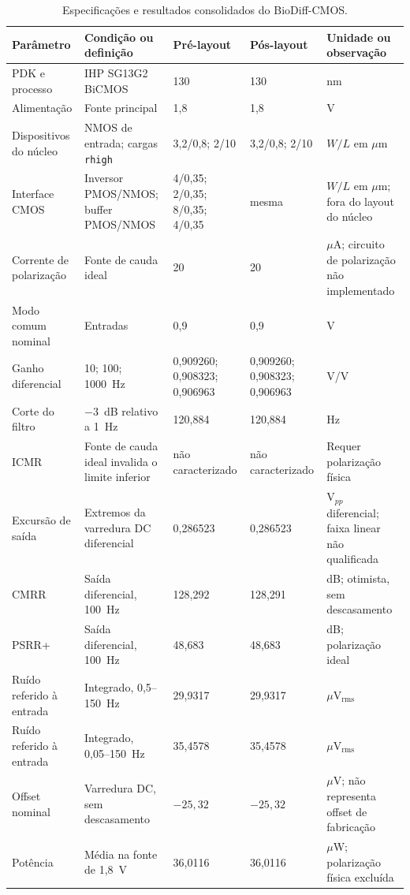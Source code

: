 \documentclass[conference]{IEEEtran}
\newcommand{\NA}{não caracterizado}
\begin{document}
\begin{table}[t]
\caption{Especificações e resultados consolidados do BioDiff-CMOS.}
\label{tab:specs}
\centering
\scriptsize
\setlength{\tabcolsep}{4pt}
\begin{tabularx}{\textwidth}{p{3.1cm} Y p{2.25cm} p{2.25cm} p{2.6cm}}
\hline
Parâmetro & Condição ou definição & Pré-layout & Pós-layout & Unidade ou observação \\
\hline
PDK e processo & IHP SG13G2 BiCMOS & 130 & 130 & nm \\
Alimentação & Fonte principal & 1,8 & 1,8 & V \\
Dispositivos do núcleo & NMOS de entrada; cargas \texttt{rhigh} & 3,2/0,8; 2/10 & 3,2/0,8; 2/10 & $W/L$ em $\mu$m \\
Interface CMOS & Inversor PMOS/NMOS; buffer PMOS/NMOS & 4/0,35; 2/0,35; 8/0,35; 4/0,35 & mesma & $W/L$ em $\mu$m; fora do layout do núcleo \\
Corrente de polarização & Fonte de cauda ideal & 20 & 20 & $\mu$A; circuito de polarização não implementado \\
Modo comum nominal & Entradas & 0,9 & 0,9 & V \\
Ganho diferencial & 10; 100; 1000~Hz & 0,909260; 0,908323; 0,906963 & 0,909260; 0,908323; 0,906963 & V/V \\
Corte do filtro & $-3$~dB relativo a 1~Hz & 120,884 & 120,884 & Hz \\
ICMR & Fonte de cauda ideal invalida o limite inferior & \NA & \NA & Requer polarização física \\
Excursão de saída & Extremos da varredura DC diferencial & 0,286523 & 0,286523 & V$_{pp}$ diferencial; faixa linear não qualificada \\
CMRR & Saída diferencial, 100~Hz & 128,292 & 128,291 & dB; otimista, sem descasamento \\
PSRR+ & Saída diferencial, 100~Hz & 48,683 & 48,683 & dB; polarização ideal \\
Ruído referido à entrada & Integrado, 0,5--150~Hz & 29,9317 & 29,9317 & $\mu$V$_{\mathrm{rms}}$ \\
Ruído referido à entrada & Integrado, 0,05--150~Hz & 35,4578 & 35,4578 & $\mu$V$_{\mathrm{rms}}$ \\
Offset nominal & Varredura DC, sem descasamento & $-25,32$ & $-25,32$ & $\mu$V; não representa offset de fabricação \\
Potência & Média na fonte de 1,8~V & 36,0116 & 36,0116 & $\mu$W; polarização física excluída \\

\end{tabularx}
\end{table}
\end{document}

